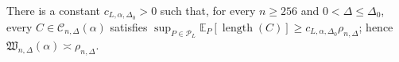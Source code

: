 There is a constant \(c_{L,\alpha,\Delta_0}>0\) such that, for every \(n\geq256\) and \(0<\Delta\leq\Delta_0\), every \(C\in\mathcal C_{n,\Delta}(\alpha)\) satisfies \(\sup_{P\in\mathcal P_L}\mathbb E_P[\operatorname{length}(C)]\geq c_{L,\alpha,\Delta_0}\rho_{n,\Delta}\); hence \(\mathfrak W_{n,\Delta}(\alpha)\asymp\rho_{n,\Delta}\).